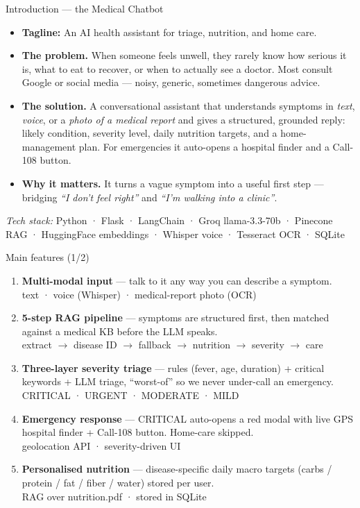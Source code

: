 \documentclass[aspectratio=169,11pt]{beamer}
\begin{document}
\begin{frame}{Introduction --- the Medical Chatbot}
  \begin{itemize}
    \item \textbf{Tagline:} An AI health assistant for triage, nutrition, and home care.
    \item \textbf{The problem.} When someone feels unwell, they rarely know how serious it is, what to eat to recover, or when to actually see a doctor. Most consult Google or social media --- noisy, generic, sometimes dangerous advice.
    \item \textbf{The solution.} A conversational assistant that understands symptoms in \emph{text}, \emph{voice}, or a \emph{photo of a medical report} and gives a structured, grounded reply: likely condition, severity level, daily nutrition targets, and a home-management plan. For emergencies it auto-opens a hospital finder and a Call-108 button.
    \item \textbf{Why it matters.} It turns a vague symptom into a useful first step --- bridging \emph{``I don't feel right''} and \emph{``I'm walking into a clinic''}.
  \end{itemize}
  \vfill
  {\scriptsize \textit{Tech stack:} Python · Flask · LangChain · Groq llama-3.3-70b · Pinecone RAG · HuggingFace embeddings · Whisper voice · Tesseract OCR · SQLite}
\end{frame}

\begin{frame}{Main features (1/2)}
  \footnotesize
  \begin{enumerate}
    \item \textbf{Multi-modal input} --- talk to it any way you can describe a symptom.\\
          {\scriptsize text · voice (Whisper) · medical-report photo (OCR)}
    \item \textbf{5-step RAG pipeline} --- symptoms are structured first, then matched against a medical KB before the LLM speaks.\\
          {\scriptsize extract $\rightarrow$ disease ID $\rightarrow$ fallback $\rightarrow$ nutrition $\rightarrow$ severity $\rightarrow$ care}
    \item \textbf{Three-layer severity triage} --- rules (fever, age, duration) + critical keywords + LLM triage, ``worst-of'' so we never under-call an emergency.\\
          {\scriptsize \textcolor{critred}{CRITICAL} · URGENT · MODERATE · MILD}
    \item \textbf{Emergency response} --- CRITICAL auto-opens a red modal with live GPS hospital finder + Call-108 button. Home-care skipped.\\
          {\scriptsize geolocation API · severity-driven UI}
    \item \textbf{Personalised nutrition} --- disease-specific daily macro targets (carbs / protein / fat / fiber / water) stored per user.\\
          {\scriptsize RAG over nutrition.pdf · stored in SQLite}
  \end{enumerate}
\end{frame}
\end{document}
